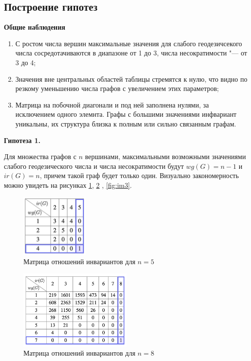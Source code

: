 \documentclass[bachelor, och, nir]{SCWorks}
\begin{document}
\newpage
\subsection{Построение гипотез}
\textbf{Общие наблюдения}
\begin{enumerate}
    \item С ростом числа вершин максимальные значения для слабого геодезичсекого числа сосредотачиваются в диапазоне от 1 до 3, числа несократимости "--- от 3 до 4;
    \item Значения вне центральных областей таблицы стремятся к нулю, что видно по резкому уменьшению числа графов с увеличением этих параметров;
    \item Матрица на побочной диагонали и под ней заполнена нулями, за исключением одного элемнта. Графы с большими значениями инфвариант уникальны, их структура близка к полным или сильно связанным графам.
\end{enumerate}

\vspace{0.5em}
\textbf{Гипотеза 1.} 

Для множества графов с $n$ вершинами, максимальными возможными значениями слабого геодезического числа и числа несократимости будут $wg(G) = n-1$ и $ir(G) = n$, причем такой граф будет только один. Визуально закономерность можно увидеть на рисунках \ref{fig:im1}, \ref{fig:im2} , \ref{fig:im3}.
\begin{figure}[ht!]  
    \centering 
    \includegraphics[width=0.3\textwidth]
{Group423.png}  
    \caption{Матрица отношений инвариантов для $n = 5$} 
    \label{fig:im1} 
\end{figure}

\begin{figure}[ht!]  
    \centering 
    \includegraphics[width=0.5\textwidth]
{Group424.png}  
    \caption{Матрица отношений инвариантов для $n = 8$} 
    \label{fig:im2} 
\end{figure}
\end{document}
